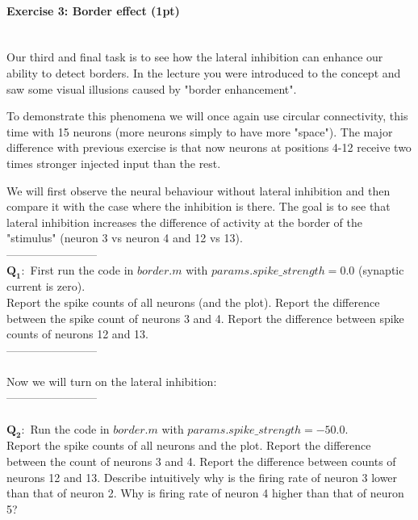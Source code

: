 \documentclass[a4paper,11pt]{article}
\newenvironment{exercise}[3]{\paragraph{Exercise #1: #2 (#3pt)}\ \\}{
\medskip}
\newcommand{\question}[2]{\setlength\parindent{10mm}\ \\$\mathbf{Q_#1:}$ #2\ \\}
\begin{document}
%
%
\begin{exercise}{3}{Border effect}{1}
Our third and final task is to see how the lateral inhibition can enhance our ability to detect borders. In the lecture you were introduced to the concept and saw some visual illusions caused by "border enhancement".

To demonstrate this phenomena we will once again use circular connectivity, this time with 15 neurons (more neurons simply to have more "space"). The major difference with previous exercise is that now neurons at positions 4-12 receive two times stronger injected input than the rest.

We will first observe the neural behaviour without lateral inhibition and then compare it with the case where the inhibition is there. The goal is to see that lateral inhibition increases the difference of activity at the border of the "stimulus" (neuron 3 vs neuron 4 and 12 vs 13).\\
------------------------
\question{1}{First run the code in $border.m$ with $params.spike\_strength = 0.0$ (synaptic current is zero).\\ Report the spike counts of all neurons (and the plot). Report the difference between the spike count of neurons 3 and 4. Report the difference between spike counts of neurons 12 and 13.}
------------------------\\
\ \\
Now we will turn on the lateral inhibition:\\
------------------------\\
\question{2}{Run the code in $border.m$ with $params.spike\_strength = -50.0$.\\
Report the spike counts of all neurons and the plot. Report the difference between the count of neurons 3 and 4. Report the difference between counts of neurons 12 and 13. Describe intuitively why is the firing rate of neuron 3 lower than that of neuron 2. Why is firing rate of neuron 4 higher than that of neuron 5?}
\end{exercise}
\end{document}
